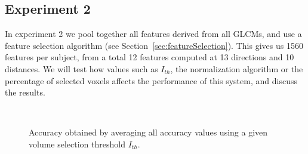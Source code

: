 \subsection{Experiment 2}
In experiment 2 we pool together all features derived from all \acp{GLCM}, and use a feature selection algorithm (see Section~\ref{sec:featureSelection}). This gives us 1560 features per subject, from a total 12 features computed at 13 directions and 10 distances. We will test how values such as $I_{th}$, the normalization algorithm or the percentage of selected voxels affects the performance of this system, and discuss the results. 

\begin{figure}[htp]
	\centering
	\\
	\caption{Accuracy obtained by averaging all accuracy values using a given volume selection threshold $I_{th}$.}
	\label{fig:averageAcc_IthNorm}
\end{figure}

